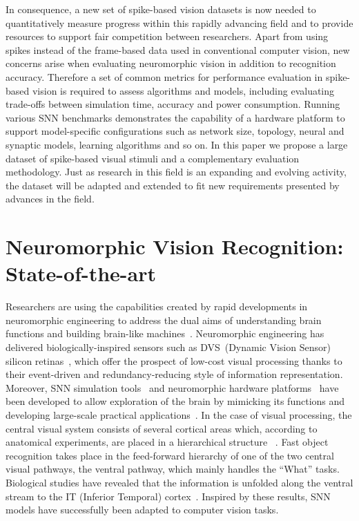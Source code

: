 In consequence, a new set of spike-based vision datasets is now needed to quantitatively measure progress within this rapidly advancing field and to provide resources to support fair competition between researchers.
Apart from using spikes instead of the frame-based data used in conventional computer vision, new concerns arise when evaluating neuromorphic vision in addition to recognition accuracy.
Therefore a set of common metrics for performance evaluation in spike-based vision is required to assess algorithms and models, including evaluating
trade-offs between simulation time, accuracy and power consumption.
Running various SNN benchmarks demonstrates the capability of a hardware platform to support model-specific configurations such as network size, topology, neural and synaptic models, learning algorithms and so on.
In this paper we propose a large dataset of spike-based visual stimuli and a complementary evaluation methodology.
Just as research in this field is an expanding and evolving activity, the dataset will be adapted and extended to fit new requirements presented by advances in the field.

\section{Neuromorphic Vision Recognition: State-of-the-art}
\label{sec:orec}
Researchers are using the capabilities created by rapid developments in neuromorphic engineering to address the dual aims of understanding brain functions and building brain-like machines~\cite{furber2007neural}.
Neuromorphic engineering has delivered biologically-inspired sensors such as DVS~(Dynamic Vision Sensor) silicon retinas~\cite{serrano2013128, delbruck2008frame, yang2015dynamic, posch2014retinomorphic}, which offer the prospect of low-cost visual processing thanks to their event-driven and redundancy-reducing style of information representation.
Moreover, SNN simulation tools~\cite{davison2008pynn, gewaltig2007nest, goodman2008brian} and neuromorphic hardware platforms~\cite{furber2014spinnaker,  schemmel2010wafer,benjamin2014neurogrid,merolla2014million} have been developed to allow exploration of the brain by mimicking its functions and developing large-scale practical applications~\cite{eliasmith2012large}.
In the case of visual processing, the central visual system consists of several cortical areas which, according to anatomical experiments, are placed in a hierarchical structure ~\cite{felleman1991distributed}.
Fast object recognition takes place in the feed-forward hierarchy of one of the two central visual pathways, the ventral pathway, which mainly handles the ``What'' tasks.
Biological studies have revealed that the information is unfolded along the ventral stream to the IT (Inferior Temporal) cortex~\cite{dicarlo2012does}.
Inspired by these results, SNN models have successfully been adapted to computer vision tasks.  


